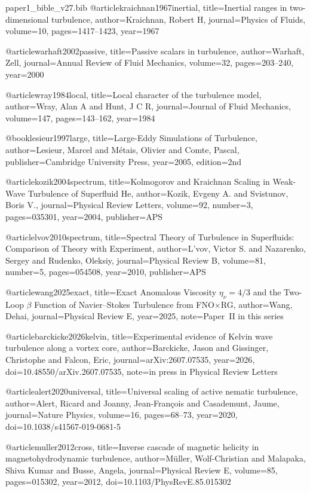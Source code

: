 \begin{filecontents}[overwrite]{paper1_bible_v27.bib}
@article{kraichnan1967inertial,
  title={Inertial ranges in two-dimensional turbulence},
  author={Kraichnan, Robert H},
  journal={Physics of Fluids},
  volume={10},
  pages={1417--1423},
  year={1967}
}

@article{warhaft2002passive,
  title={Passive scalars in turbulence},
  author={Warhaft, Zell},
  journal={Annual Review of Fluid Mechanics},
  volume={32},
  pages={203--240},
  year={2000}
}

@article{wray1984local,
  title={Local character of the turbulence model},
  author={Wray, Alan A and Hunt, J C R},
  journal={Journal of Fluid Mechanics},
  volume={147},
  pages={143--162},
  year={1984}
}

@book{lesieur1997large,
  title={Large-Eddy Simulations of Turbulence},
  author={Lesieur, Marcel and M{\'e}tais, Olivier and Comte, Pascal},
  publisher={Cambridge University Press},
  year={2005},
  edition={2nd}
}


@article{kozik2004spectrum,
  title={Kolmogorov and {Kraichnan} Scaling in Weak-Wave Turbulence of Superfluid {He}},
  author={Kozik, Evgeny A. and Svistunov, Boris V.},
  journal={Physical Review Letters},
  volume={92},
  number={3},
  pages={035301},
  year={2004},
  publisher={APS}
}

@article{lvov2010spectrum,
  title={Spectral Theory of Turbulence in {Superfluids}: Comparison of Theory with Experiment},
  author={L'vov, Victor S. and Nazarenko, Sergey and Rudenko, Oleksiy},
  journal={Physical Review B},
  volume={81},
  number={5},
  pages={054508},
  year={2010},
  publisher={APS}
}

@article{wang2025exact,
  title={Exact Anomalous Viscosity $\eta_\nu = 4/3$ and the Two-Loop $\beta$ Function of {Navier--Stokes} Turbulence from {FNO$\times$RG}},
  author={Wang, Dehai},
  journal={Physical Review E},
  year={2025},
  note={Paper~II in this series}
}

@article{barckicke2026kelvin,
  title={Experimental evidence of {K}elvin wave turbulence along a vortex core},
  author={Barckicke, Jason and Gissinger, Christophe and Falcon, Eric},
  journal={arXiv:2607.07535},
  year={2026},
  doi={10.48550/arXiv.2607.07535},
  note={in press in Physical Review Letters}
}

@article{alert2020universal,
  title={Universal scaling of active nematic turbulence},
  author={Alert, Ricard and Joanny, Jean-Fran{\c{c}}ois and Casademunt, Jaume},
  journal={Nature Physics},
  volume={16},
  pages={68--73},
  year={2020},
  doi={10.1038/s41567-019-0681-5}
}

@article{muller2012cross,
  title={Inverse cascade of magnetic helicity in magnetohydrodynamic turbulence},
  author={M{\"u}ller, Wolf-Christian and Malapaka, Shiva Kumar and Busse, Angela},
  journal={Physical Review E},
  volume={85},
  pages={015302},
  year={2012},
  doi={10.1103/PhysRevE.85.015302}
}
\end{filecontents}
\documentclass[preprint,amsmath,amssymb,floatfix,superscriptaddress]{revtex4-2}

